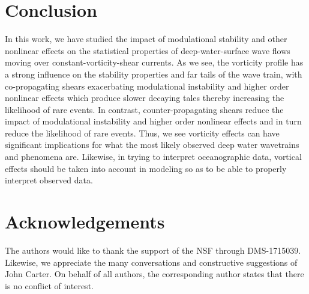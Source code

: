 \documentclass[a4paper,11pt]{article}
\begin{document}
\section{Conclusion}

In this work, we have studied the impact of modulational stability and other nonlinear effects on the statistical properties of deep-water-surface wave flows moving over constant-vorticity-shear currents.  As we see, the vorticity profile has a strong influence on the stability properties and far tails of the wave train, with co-propagating shears exacerbating modulational instability and higher order nonlinear effects which produce slower decaying tales thereby increasing the likelihood of rare events.  In contrast, counter-propagating shears reduce the impact of modulational instability and higher order nonlinear effects and in turn reduce the likelihood of rare events.  Thus, we see vorticity effects can have significant implications for what the most likely observed deep water wavetrains and phenomena are.  Likewise, in trying to interpret oceanographic data, vortical effects should be taken into account in modeling so as to be able to properly interpret observed data.    

\section*{Acknowledgements}
The authors would like to thank the support of the NSF through DMS-1715039.  Likewise, we appreciate the many conversations and constructive suggestions of John Carter.  On behalf of all authors, the corresponding author states that there is no conflict of interest.

\pagebreak


\end{document}
